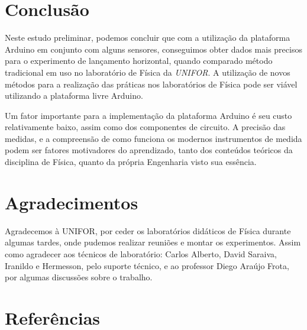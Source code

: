 \documentclass[11pt,a4paper]{article}
\begin{document}
\section{Conclusão}

Neste estudo preliminar, podemos concluir que
com a utilização da plataforma Arduino em conjunto com alguns sensores, conseguimos obter dados mais precisos para o experimento de lançamento horizontal, quando comparado método tradicional em uso no laboratório de Física da \emph{UNIFOR}.
A utilização de novos métodos para a realização das práticas nos laboratórios de Física pode ser viável utilizando a plataforma livre Arduino.

Um fator importante para a implementação da plataforma Arduino é seu custo relativamente baixo, assim como dos componentes de circuito.
A precisão das medidas, e a compreensão de como funciona os modernos instrumentos de medida podem ser fatores motivadores do aprendizado, tanto dos conteúdos teóricos da disciplina de Física, quanto da própria Engenharia visto sua essência.




\section{Agradecimentos}

Agradecemos à UNIFOR, por ceder os laboratórios didáticos de Física durante algumas tardes, onde pudemos realizar reuniões e montar os experimentos.
Assim como agradecer aos técnicos de laboratório: Carlos Alberto, David Saraiva, Iranildo e Hermesson, pelo suporte técnico, e ao professor Diego Araújo Frota, por algumas discussões sobre o trabalho.



\section*{Referências}

\printbibliography[heading=none]{}




\end{document}
